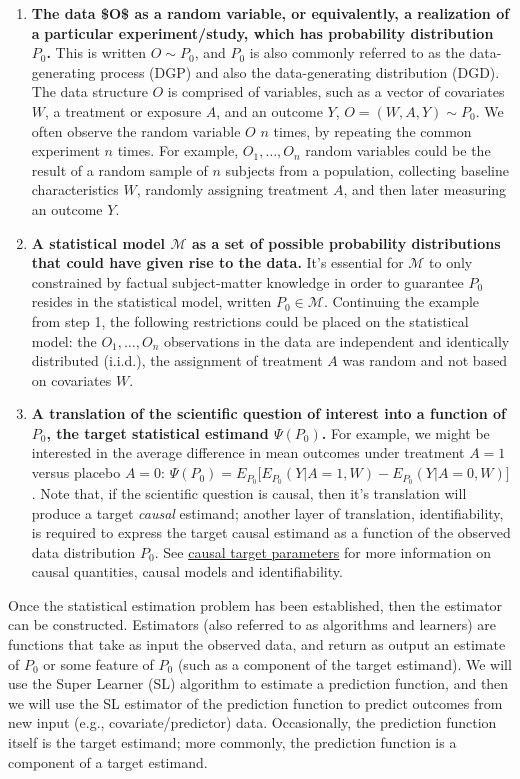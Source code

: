 \documentclass[
  12pt, krantz2,
]{krantz}
\providecommand{\tightlist}{%
  \setlength{\itemsep}{0pt}\setlength{\parskip}{0pt}}
\newcommand{\M}{\mathcal{M}}
\newcommand{\1}{\mathbbm{1}}
\theoremstyle{definition}
\theoremstyle{definition}
\theoremstyle{definition}
\theoremstyle{definition}
\theoremstyle{remark}
\begin{document}
\begin{enumerate}
\def\labelenumi{\arabic{enumi}.}
\tightlist
\item
  \textbf{The data \$O\$ as a random variable, or equivalently, a realization of a}
  \textbf{particular experiment/study, which has probability distribution \(P_0\).}
  This is written \(O \sim P_0\), and \(P_0\) is also commonly referred to as the
  data-generating process (DGP) and also the data-generating distribution
  (DGD). The data structure \(O\) is comprised of variables, such as a
  vector of covariates \(W\), a treatment or exposure \(A\), and an outcome \(Y\),
  \(O=(W,A,Y) \sim P_0\). We often observe the random variable \(O\) \(n\) times, by
  repeating the common experiment \(n\) times. For example, \(O_1,\ldots, O_n\)
  random variables could be the result of a random sample of \(n\) subjects from
  a population, collecting baseline characteristics \(W\), randomly assigning
  treatment \(A\), and then later measuring an outcome \(Y\).
\item
  \textbf{A statistical model \(\M\) as a set of possible probability distributions}
  \textbf{that could have given rise to the data.} It's essential for \(\M\) to only
  constrained by factual subject-matter knowledge in order to guarantee \(P_0\)
  resides in the statistical model, written \(P_0 \in \M\). Continuing
  the example from step 1, the following restrictions could be placed on the
  statistical model: the \(O_1, \ldots, O_n\) observations in the data are
  independent and identically distributed (i.i.d.), the assignment of
  treatment \(A\) was random and not based on covariates \(W\).
\item
  \textbf{A translation of the scientific question of interest into a function of}
  \textbf{\(P_0\), the target statistical estimand \(\Psi(P_0)\).} For example, we might
  be interested in the average difference in mean outcomes under treatment
  \(A=1\) versus placebo \(A=0\):
  \(\Psi(P_0)=E_{P_0}\Big[E_{P_0}(Y|A=1,W)−E_{P_0}(Y|A=0,W)\Big]\). Note
  that, if the scientific question is causal, then it's translation will
  produce a target \emph{causal} estimand; another layer of translation,
  identifiability, is required to express the target causal estimand as a
  function of the observed data distribution \(P_0\). See \protect\hyperlink{causal}{causal target
  parameters} for more information on causal quantities, causal models
  and identifiability.
\end{enumerate}

Once the statistical estimation problem has been established, then the estimator
can be constructed. Estimators (also referred to as algorithms and learners)
are functions that take as input the observed data, and return as output an
estimate of \(P_0\) or some feature of \(P_0\) (such as a component of the target
estimand). We will use the Super Learner (SL) algorithm to estimate a
prediction function, and then we will use the SL estimator of the prediction
function to predict outcomes from new input (e.g., covariate/predictor) data.
Occasionally, the prediction function itself is the target estimand; more
commonly, the prediction function is a component of a target estimand.
\end{document}
